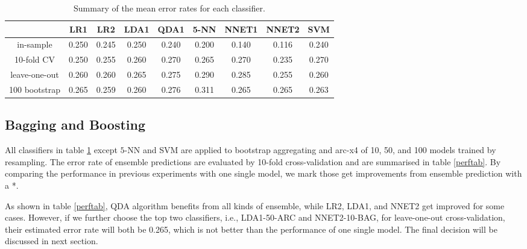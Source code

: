 \documentclass[a4paper,12pt]{article}
\begin{document}
\begin{table}
\begin{center}
\caption[summary comparison]{Summary of the mean error rates for each classifier.}
\label{compall}
\begin{tabular}{ccccccccc}
\hline
              & LR1   & LR2   & LDA1  & QDA1  & 5-NN  & NNET1 & NNET2 & SVM  \\
\hline
in-sample     & 0.250 & 0.245 & 0.250 & 0.240 & 0.200 & 0.140 & 0.116 & 0.240 \\
10-fold CV    & 0.250 & 0.255 & 0.260 & 0.270 & 0.265 & 0.270 & 0.235 & 0.270 \\
leave-one-out & 0.260 & 0.260 & 0.265 & 0.275 & 0.290 & 0.285 & 0.255 & 0.260 \\
100 bootstrap & 0.265 & 0.259 & 0.260 & 0.276 & 0.311 & 0.265 & 0.265 & 0.263 \\
\hline
\end{tabular}
\end{center}
\end{table}


\subsection*{\bf Bagging and Boosting}
All classifiers in table \ref{compall} except $5$-NN and SVM are applied to bootstrap aggregating and arc-x4 of 10, 50, and 100 models trained by resampling.  The error rate of ensemble predictions are evaluated by 10-fold cross-validation and are summarised in table \ref{perftab}.  By comparing the performance in previous experiments with one single model, we mark those get improvements from ensemble prediction with a *.

As shown in table \ref{perftab}, QDA algorithm benefits from all kinds of ensemble, while LR2, LDA1, and NNET2 get improved for some cases.  However, if we further choose the top two classifiers, i.e., LDA1-50-ARC and NNET2-10-BAG, for leave-one-out cross-validation, their estimated error rate will both be 0.265, which is not better than the performance of one single model.  The final decision will be discussed in next section.
\end{document}
